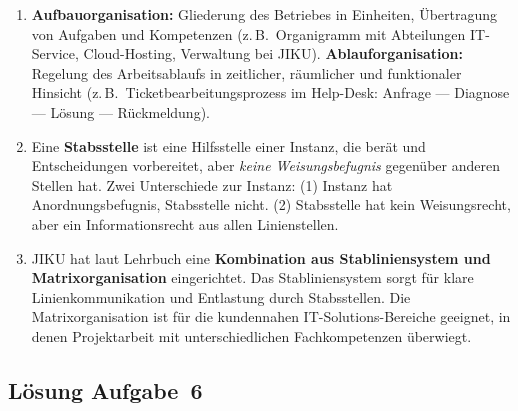 \documentclass[11pt, a4paper]{article}
\begin{document}
\begin{enumerate}[label=(\alph*)]
  \item \textbf{Aufbauorganisation:} Gliederung des Betriebes in Einheiten, Übertragung von Aufgaben
  und Kompetenzen (z.\,B.\ Organigramm mit Abteilungen IT-Service, Cloud-Hosting, Verwaltung bei
  JIKU). \textbf{Ablauforganisation:} Regelung des Arbeitsablaufs in zeitlicher, räumlicher und
  funktionaler Hinsicht (z.\,B.\ Ticketbearbeitungsprozess im Help-Desk: Anfrage --- Diagnose ---
  Lösung --- Rückmeldung).

  \item Eine \textbf{Stabsstelle} ist eine Hilfsstelle einer Instanz, die berät und Entscheidungen
  vorbereitet, aber \emph{keine Weisungsbefugnis} gegenüber anderen Stellen hat. Zwei Unterschiede
  zur Instanz: (1) Instanz hat Anordnungsbefugnis, Stabsstelle nicht. (2) Stabsstelle hat kein
  Weisungsrecht, aber ein Informationsrecht aus allen Linienstellen.

  \item JIKU hat laut Lehrbuch eine \textbf{Kombination aus Stabliniensystem und Matrixorganisation}
  eingerichtet. Das Stabliniensystem sorgt für klare Linienkommunikation und Entlastung durch
  Stabsstellen. Die Matrixorganisation ist für die kundennahen IT-Solutions-Bereiche geeignet, in
  denen Projektarbeit mit unterschiedlichen Fachkompetenzen überwiegt.
\end{enumerate}

\subsection*{Lösung Aufgabe~6}
\end{document}
